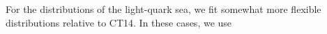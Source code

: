 %
%
%
%
%
%
%
%
%
%
%
%
%
%
%
%
%
%
%
%
%
For the distributions of the light-quark sea, we fit somewhat
more flexible distributions relative to CT14. In these cases, we use
